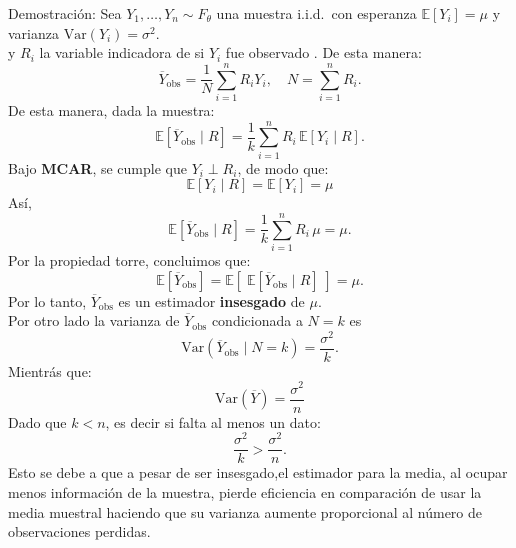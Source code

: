 \documentclass[a4paper,11pt]{article}
\begin{document}
\begin{demostracion}{Demostración:}
    Sea $Y_1,\dots,Y_n \sim  F_\theta $ una muestra i.i.d.~con esperanza
    $\mathbb{E}[Y_i]=\mu$ y varianza $\mathrm{Var}(Y_i)=\sigma^2$.\\
    y  $R_i$ la variable indicadora de si $Y_i$ fue observado .
    De esta manera:
    \[
        \overline{Y}_{\text{obs}} = \frac{1}{N} \sum_{i=1}^n R_i Y_i,
        \quad N=\sum_{i=1}^n R_i.
    \]
    De esta manera, dada la muestra:
    \[
        \mathbb{E}\!\left[\overline{Y}_{\text{obs}} \mid R\right]
        = \frac{1}{k}\sum_{i=1}^n R_i\,\mathbb{E}[Y_i \mid R].
    \]
    Bajo  \textbf{MCAR}, se cumple que
    $Y_i \perp R_i$, de modo que:
    \[
        \mathbb{E}[Y_i \mid R]=\mathbb{E}[Y_i]=\mu
    \]
    Así,
    \[
        \mathbb{E}\!\left[\overline{Y}_{\text{obs}} \mid R\right]
        = \frac{1}{k}\sum_{i=1}^n R_i\,\mu = \mu.
    \]
    Por la propiedad torre, concluimos que:
    \[
        \mathbb{E}[\overline{Y}_{\text{obs}}]
        = \mathbb{E}\!\left[\;\mathbb{E}[\overline{Y}_{\text{obs}}\mid R]\;\right]
        = \mu.
    \]
    Por lo tanto, $\overline{Y}_{\text{obs}}$ es un estimador \textbf{insesgado} de $\mu$.\\
    Por otro lado la varianza de $\overline{Y}_{\text{obs}}$ condicionada a $N=k$ es
    \[
        \mathrm{Var}(\overline{Y}_{\text{obs}} \mid N=k)
        = \frac{\sigma^2}{k}.
    \]
    Mientrás que:
    \[
        \mathrm{Var}(\overline{Y})=\dfrac{\sigma^2}{n}
    \]
    Dado que $k<n$, es decir si falta al menos un dato:
    \[
        \frac{\sigma^2}{k} > \frac{\sigma^2}{n}.
    \]
    Esto se debe a que a pesar de ser insesgado,el estimador para la media, al ocupar menos información de la muestra, pierde eficiencia en comparación de usar la media muestral haciendo que su varianza aumente proporcional al número de observaciones perdidas.
\end{demostracion}
\end{document}
